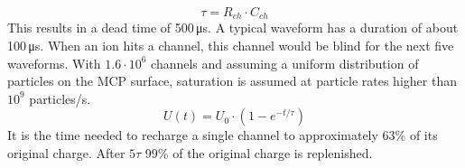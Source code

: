 		\begin{equation}
			\tau = R_{ch}\cdot C_{ch}
		\end{equation}
		This results in a dead time of 500\,\si{\micro\second}. A typical waveform has a duration of about 100\,\si{\micro\second}. When an ion hits a channel, this channel would be blind for the next five waveforms. With $1.6\cdot10^6$ channels and assuming a uniform distribution of particles on the MCP surface, saturation is assumed at particle rates higher than $10^9$ particles/\si{\second}. %
		\begin{equation}
			U(t) = U_0\cdot(1- e^{-t/\tau})
		\end{equation}
		It is the time needed to recharge a single channel to approximately 63\% of its original charge. After $5\tau$ 99\% of the original charge is replenished. %
		
		
		
		

